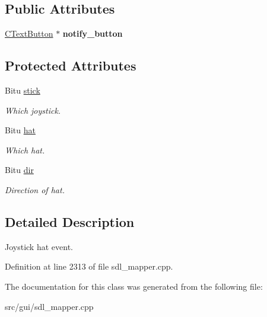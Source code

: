 \subsection*{Public Attributes}
\begin{DoxyCompactItemize}
\item 
\hypertarget{classCJHatEvent_a4d7f2a971b1ecad29e15806dfedfbbf4}{\hyperlink{classCTextButton}{C\-Text\-Button} $\ast$ {\bfseries notify\-\_\-button}}\label{classCJHatEvent_a4d7f2a971b1ecad29e15806dfedfbbf4}

\end{DoxyCompactItemize}
\subsection*{Protected Attributes}
\begin{DoxyCompactItemize}
\item 
\hypertarget{classCJHatEvent_a53d2e407f823a8bd30a2c0d5613cb29b}{Bitu \hyperlink{classCJHatEvent_a53d2e407f823a8bd30a2c0d5613cb29b}{stick}}\label{classCJHatEvent_a53d2e407f823a8bd30a2c0d5613cb29b}

\begin{DoxyCompactList}\small\item\em Which joystick. \end{DoxyCompactList}\item 
\hypertarget{classCJHatEvent_a33cb6a20470c519958c6fd0929bcc7cd}{Bitu \hyperlink{classCJHatEvent_a33cb6a20470c519958c6fd0929bcc7cd}{hat}}\label{classCJHatEvent_a33cb6a20470c519958c6fd0929bcc7cd}

\begin{DoxyCompactList}\small\item\em Which hat. \end{DoxyCompactList}\item 
\hypertarget{classCJHatEvent_a8f7cc4b080b4f6054d6da118209683b7}{Bitu \hyperlink{classCJHatEvent_a8f7cc4b080b4f6054d6da118209683b7}{dir}}\label{classCJHatEvent_a8f7cc4b080b4f6054d6da118209683b7}

\begin{DoxyCompactList}\small\item\em Direction of hat. \end{DoxyCompactList}\end{DoxyCompactItemize}


\subsection{Detailed Description}
Joystick hat event. 

Definition at line 2313 of file sdl\-\_\-mapper.\-cpp.



The documentation for this class was generated from the following file\-:\begin{DoxyCompactItemize}
\item 
src/gui/sdl\-\_\-mapper.\-cpp\end{DoxyCompactItemize}
